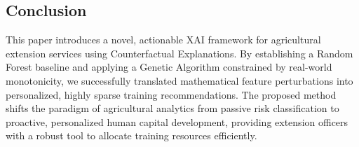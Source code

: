 \documentclass[12pt, a4paper]{article}
\begin{document}
\subsection{Conclusion}
This paper introduces a novel, actionable XAI framework for agricultural extension services using Counterfactual Explanations. By establishing a Random Forest baseline and applying a Genetic Algorithm constrained by real-world monotonicity, we successfully translated mathematical feature perturbations into personalized, highly sparse training recommendations. The proposed method shifts the paradigm of agricultural analytics from passive risk classification to proactive, personalized human capital development, providing extension officers with a robust tool to allocate training resources efficiently.
\end{document}
